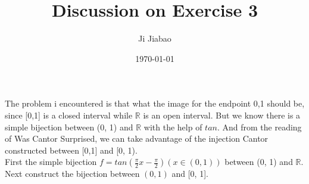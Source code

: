 \documentclass{article}
\title{Discussion on Exercise 3}
\author{Ji Jiabao}
\date{\today}
\begin{document}
    \maketitle
    The problem i encountered is that what the image for the endpoint 0,1 should be, 
    since [0,1] is a closed interval while $\mathbb{R}$ is an open interval. 
    But we know there is a simple bijection between (0, 1) and $\mathbb{R}$ with the help of $tan$.
    And from the reading of Was Cantor Surprised, we can take advantage of the injection
    Cantor constructed between [0,1] and [0, 1).\\

    First the simple bijection $f = tan(\frac{\pi}{2} x - \frac{\pi}{2}) (x \in (0, 1))$ between (0, 1) and $\mathbb{R}$.\\
    Next construct the bijection between $(0, 1)$ and [0, 1].
\end{document}
